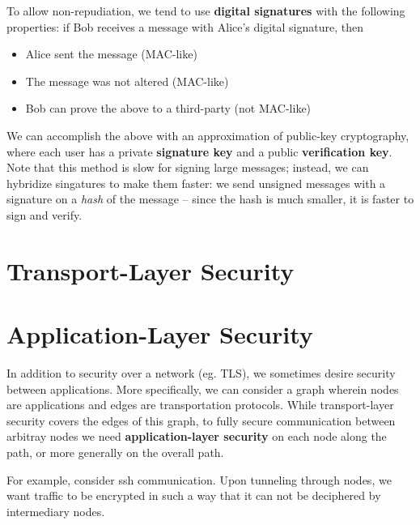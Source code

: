 \documentclass[12pt]{article}
\begin{document}
To allow non-repudiation, we tend to use {\bf digital signatures} with the following properties: if Bob receives a message with Alice's digital signature, then
\begin{itemize}
\item Alice sent the message (MAC-like)
\item The message was not altered (MAC-like)
\item Bob can prove the above to a third-party (not MAC-like)
\end{itemize}

We can accomplish the above with an approximation of public-key cryptography, where each user has a private {\bf signature key} and a public {\bf verification key}. Note that this method is slow for signing large messages; instead, we can hybridize singatures to make them faster: we send unsigned messages with a signature on a \emph{hash} of the message -- since the hash is much smaller, it is faster to sign and verify.


\section*{Transport-Layer Security}

\section*{Application-Layer Security}
In addition to security over a network (eg. TLS), we sometimes desire security between applications. More specifically, we can consider a graph wherein nodes are applications and edges are transportation protocols. While transport-layer security covers the edges of this graph, to fully secure communication between arbitray nodes we need {\bf application-layer security} on each node along the path, or more generally on the overall path.

For example, consider ssh communication. Upon tunneling through nodes, we want traffic to be encrypted in such a way that it can not be deciphered by intermediary nodes.
\end{document}
